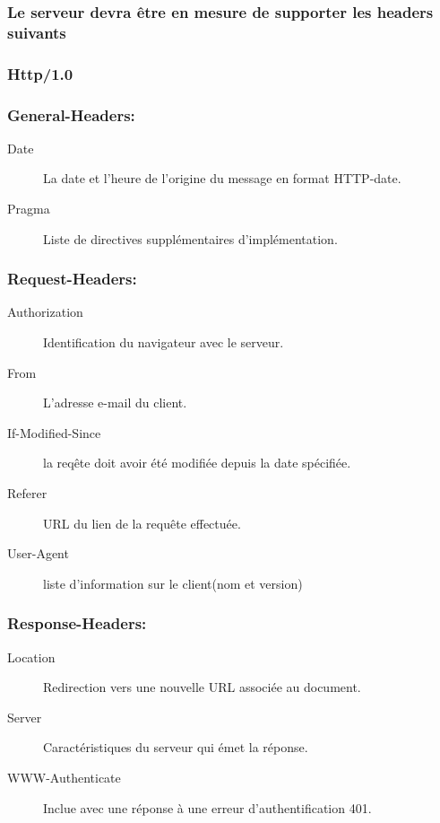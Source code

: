 \documentclass{scrreprt}
\begin{document}
\subsubsection{Le serveur devra être en mesure de supporter les headers suivants}

\subsubsection{Http/1.0}
\subsubsection{General-Headers:}
        \begin{description}
        \item [Date] La date et l'heure de l'origine du message en format HTTP-date.
        \item [Pragma] Liste de directives supplémentaires d'implémentation.
        \end{description}
\subsubsection{Request-Headers:}
        \begin{description}
        \item [Authorization] Identification du navigateur avec le serveur.
        \item [From] L'adresse e-mail du client.      
        \item [If-Modified-Since] la reqête doit avoir été modifiée depuis la date spécifiée.
        \item [Referer] URL du lien de la requête effectuée.          
        \item [User-Agent] liste d'information sur le client(nom et version)       
        \end{description}
\subsubsection{Response-Headers:}
        \begin{description}
        \item [Location] Redirection vers une nouvelle URL associée au document.           
        \item [Server] Caractéristiques du serveur qui émet la réponse.          
        \item [WWW-Authenticate] Inclue avec une réponse à une erreur d'authentification 401.
        \end{description}
\end{document}
